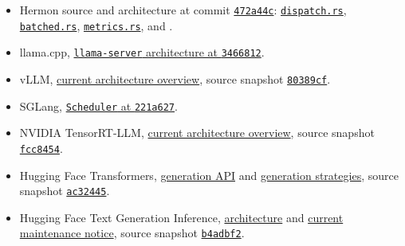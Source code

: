 \documentclass[
  10pt,
]{article}
\providecommand{\tightlist}{%
  \setlength{\itemsep}{0pt}\setlength{\parskip}{0pt}}
\begin{document}
\begin{itemize}
\tightlist
\item
  Hermon source and architecture at commit
  \href{https://github.com/hermonai/hermon/commit/472a44cdb511b2dae6c9569e59543db8f8350b25}{\texttt{472a44c}}:
  \href{https://github.com/hermonai/hermon/blob/472a44cdb511b2dae6c9569e59543db8f8350b25/crates/hermon-runtime/src/dispatch.rs}{\texttt{dispatch.rs}},
  \href{https://github.com/hermonai/hermon/blob/472a44cdb511b2dae6c9569e59543db8f8350b25/crates/hermon-runtime/src/batched.rs}{\texttt{batched.rs}},
  \href{https://github.com/hermonai/hermon/blob/472a44cdb511b2dae6c9569e59543db8f8350b25/crates/hermon-runtime/src/metrics.rs}{\texttt{metrics.rs}},
  and
  \href{https://github.com/hermonai/hermon/blob/472a44cdb511b2dae6c9569e59543db8f8350b25/docs/CORE_ENGINE_ARCHITECTURE.md}{\texttt{}}.
\item
  llama.cpp,
  \href{https://github.com/ggml-org/llama.cpp/blob/3466812d1f06728effe7c0f3c0671117f461672d/tools/server/README-dev.md}{\texttt{llama-server}
  architecture at \texttt{3466812}}.
\item
  vLLM,
  \href{https://docs.vllm.ai/en/latest/design/arch_overview/}{current
  architecture overview}, source snapshot
  \href{https://github.com/vllm-project/vllm/commit/80389cfedd5040e382d64a64b1782f66de1a38bf}{\texttt{80389cf}}.
\item
  SGLang,
  \href{https://github.com/sgl-project/sglang/blob/221a6273ce3212c79483df233b4511fdf8fbe6d0/python/sglang/srt/managers/scheduler.py}{\texttt{Scheduler}
  at \texttt{221a627}}.
\item
  NVIDIA TensorRT-LLM,
  \href{https://nvidia.github.io/TensorRT-LLM/latest/developer-guide/overview.html}{current
  architecture overview}, source snapshot
  \href{https://github.com/NVIDIA/TensorRT-LLM/commit/fcc84548ee6000530222600b33c4e733eaaf4de1}{\texttt{fcc8454}}.
\item
  Hugging Face Transformers,
  \href{https://huggingface.co/docs/transformers/main_classes/text_generation}{generation
  API} and
  \href{https://huggingface.co/docs/transformers/generation_strategies}{generation
  strategies}, source snapshot
  \href{https://github.com/huggingface/transformers/commit/ac3244569528944b9d5773cafea525cd8a8b63de}{\texttt{ac32445}}.
\item
  Hugging Face Text Generation Inference,
  \href{https://huggingface.co/docs/text-generation-inference/architecture}{architecture}
  and
  \href{https://huggingface.co/docs/text-generation-inference/index}{current
  maintenance notice}, source snapshot
  \href{https://github.com/huggingface/text-generation-inference/commit/b4adbf2f6e2e721280bd0ea5f91d70f7d033f5ed}{\texttt{b4adbf2}}.
\end{itemize}
\end{document}

